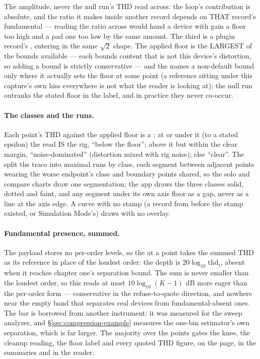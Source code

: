 \documentclass[11pt,a4paper]{article}
\begin{document}
The amplitude, never the null run's THD read across: the loop's
contribution is absolute, and the ratio it makes inside another record
depends on THAT record's fundamental --- reading the ratio across would
hand a device with gain a floor too high and a pad one too low by the
same amount. The third is a plugin record's ,
entering in the same $\sqrt2$ shape. The applied floor is the LARGEST of
the bounds available --- each bounds content that is not this device's
distortion, so adding a bound is strictly conservative --- and the
 names a non-default bound only where it actually
sets the floor at some point (a reference sitting under this capture's
own hiss everywhere is not what the reader is looking at); the null run
outranks the stated floor in the label, and in practice they never
co-occur.

\paragraph{The classes and the runs.} Each point's THD against the
applied floor is a : at or under it (to a stated
epsilon) the read IS the rig, ``below the floor''; above it but within
the clear margin, ``noise-dominated'' (distortion mixed with rig noise);
else ``clear''. The  split the trace into maximal runs
by class, each segment between adjacent points wearing the worse
endpoint's class and boundary points shared, so the solo and compare
charts draw one segmentation; the app draws the three classes solid,
dotted and faint, and any segment under its own axis floor as a gap,
never as a line at the axis edge. A curve with no stamp (a record from
before the stamp existed, or Simulation Mode's) draws with no overlay.

\paragraph{Fundamental presence, summed.} The payload stores no
per-order levels, so the  at a point takes
the summed THD as its reference in place of the loudest order: the depth
is $20\log_{10}\mathrm{thd}_i$, absent when it reaches chapter one's
separation bound. The sum is never smaller than the loudest order, so
this reads at most $10\log_{10}(K-1)$ dB more eager than the per-order
form --- conservative in the refuse-to-quote direction, and nowhere near
the empty band that separates real devices from fundamental-absent ones.
The bar is borrowed from another instrument: it was measured for the
sweep analyzer, and \S\ref{sec:compression-example} measures the one-bin
estimator's own separation, which is far larger. The majority over the
points gates the knee, the cleanup reading, the floor label and every
quoted THD figure, on the page, in the summaries and in the reader.
\end{document}
